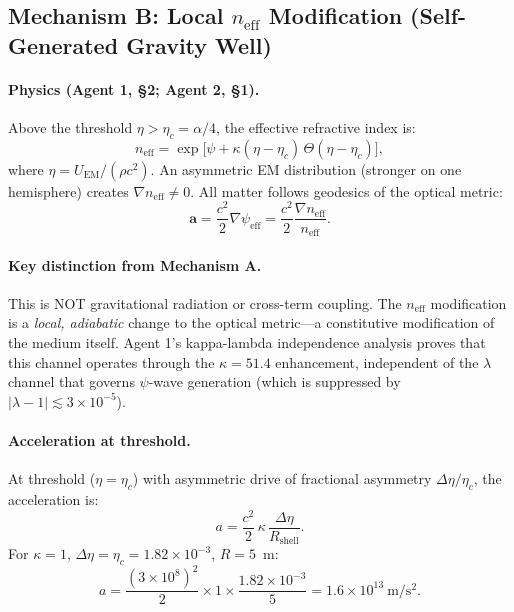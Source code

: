 \documentclass[12pt,aps,prd,superscriptaddress,nofootinbib,longbibliography]{revtex4-2}
\newcommand{\avec}{\mathbf{a}}
\newcommand{\neff}{n_{\mathrm{eff}}}
\newcommand{\etac}{\eta_c}
\begin{document}
\subsection{Mechanism B: Local $n_{\mathrm{eff}}$ Modification (Self-Generated Gravity Well)}

\paragraph{Physics (Agent 1, \S2; Agent 2, \S1).}
Above the threshold $\eta > \etac = \alpha/4$, the effective refractive
index is:
\begin{equation}
\neff = \exp\!\Big[\psi + \kappa(\eta - \etac)\,\Theta(\eta - \etac)\Big],
\label{eq:neff}
\end{equation}
where $\eta = U_{\mathrm{EM}}/(\rho c^2)$.  An asymmetric EM distribution
(stronger on one hemisphere) creates $\nabla\neff \neq 0$.  All matter
follows geodesics of the optical metric:
\begin{equation}
\avec = \frac{c^2}{2}\nabla\psi_{\mathrm{eff}}
= \frac{c^2}{2}\frac{\nabla\neff}{\neff}.
\label{eq:geodesic}
\end{equation}

\paragraph{Key distinction from Mechanism A.}
This is NOT gravitational radiation or cross-term coupling.  The
$\neff$ modification is a \emph{local, adiabatic} change to the optical
metric---a constitutive modification of the medium itself.  Agent 1's
kappa-lambda independence analysis proves that this channel operates through
the $\kappa = 51.4$ enhancement, independent of the $\lambda$ channel
that governs $\psi$-wave generation (which is suppressed by
$|\lambda - 1| \lesssim 3 \times 10^{-5}$).

\paragraph{Acceleration at threshold.}
At threshold ($\eta = \etac$) with asymmetric drive of fractional
asymmetry $\Delta\eta/\etac$, the acceleration is:
\begin{equation}
a = \frac{c^2}{2}\,\kappa\,\frac{\Delta\eta}{R_{\mathrm{shell}}}.
\end{equation}
For $\kappa = 1$, $\Delta\eta = \etac = 1.82 \times 10^{-3}$,
$R = 5$~m:
\begin{equation}
a = \frac{(3 \times 10^8)^2}{2} \times 1 \times
\frac{1.82 \times 10^{-3}}{5} = 1.6 \times 10^{13}~\mathrm{m/s^2}.
\end{equation}
\end{document}
